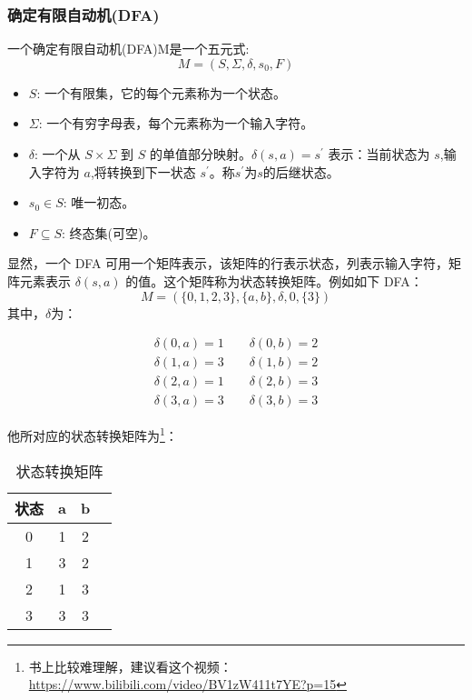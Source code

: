 \subsubsection{\textcolor{imp}{确定有限自动机(DFA)}}

一个确定有限自动机(DFA)M是一个五元式:
\[ M = (S,\Sigma,\delta,s_0,F) \]

\begin{itemize}
    \item $S$: 一个有限集，它的每个元素称为一个状态。
    \item $\Sigma$: 一个有穷字母表，每个元素称为一个输入字符。
    \item $\delta$: 一个从 $S \times \Sigma$ 到 $S$ 的单值部分映射。$\delta(s,a)=s^{'}$ 表示：当前状态为 $s$,输入字符为 $a$,将转换到下一状态 $s^{'}$。称$s^{'}$为$s$的后继状态。
    \item $s_0\in S$: 唯一初态。
    \item $F\subseteq S$: 终态集(可空)。
\end{itemize}

显然，一个 DFA 可用一个矩阵表示，该矩阵的行表示状态，列表示输入字符，矩阵元素表示 $\delta(s,a)$ 的值。这个矩阵称为状态转换矩阵。例如如下 DFA：
\[ M = (\{0,1,2,3\},\{a,b\},\delta,0,\{3\}) \]
其中，$\delta$为：

\begin{equation}
    \begin{aligned}
        \delta(0,a) = 1 \qquad \delta(0,b) = 2 \\
        \delta(1,a) = 3 \qquad \delta(1,b) = 2 \\
        \delta(2,a) = 1 \qquad \delta(2,b) = 3 \\
        \delta(3,a) = 3 \qquad \delta(3,b) = 3 \nonumber
    \end{aligned}
\end{equation}

他所对应的状态转换矩阵为\footnote{书上比较难理解，建议看这个视频：\url{https://www.bilibili.com/video/BV1zW411t7YE?p=15}}：
\begin{table}[H]
    \centering
    \caption{状态转换矩阵}
    \label{table:状态转换矩阵}
    \setlength{\tabcolsep}{15mm}
    \begin{tabular}{c|ccc}
        \toprule
        \textbf{状态} & \textbf{a} & \textbf{b} \\
        \midrule
        0             & 1          & 2          \\
        1             & 3          & 2          \\
        2             & 1          & 3          \\
        3             & 3          & 3          \\
        \bottomrule
    \end{tabular}
\end{table}

